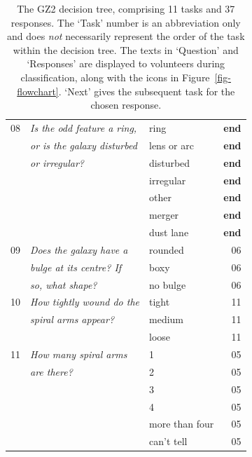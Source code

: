 \documentclass[useAMS,usenatbib]{mn2e}
\begin{document}
\begin{table}
\begin{tabular}{@{}cllr}
08    & {\it Is the odd feature a ring,    }  & ring             & {\bf end}        \\
      & {\it or is the galaxy disturbed    }  & lens or arc      & {\bf end}        \\
      & {\it or irregular?                 }  & disturbed        & {\bf end}        \\
      & {\it                               }  & irregular        & {\bf end}        \\  
      & {\it                               }  & other            & {\bf end}        \\  
      & {\it                               }  & merger           & {\bf end}        \\  
      & {\it                               }  & dust lane        & {\bf end}        \\  
      \hline
09    & {\it Does the galaxy have a        }  & rounded          & 06 \\
      & {\it bulge at its centre? If       }  & boxy             & 06 \\
      & {\it so, what shape?               }  & no bulge         & 06 \\
      \hline
10    & {\it How tightly wound do the      }  & tight            & 11 \\
      & {\it spiral arms appear?           }  & medium           & 11 \\
      & {\it                               }  & loose            & 11 \\    
      \hline
11    & {\it How many spiral arms          }  & 1                & 05 \\
      & {\it  are there?                   }  & 2                & 05 \\
      & {\it                               }  & 3                & 05 \\
      & {\it                               }  & 4                & 05 \\
      & {\it                               }  & more than four   & 05 \\
      & {\it                               }  & can't tell       & 05 \\
\hline
 \end{tabular}
 \caption{The GZ2 decision tree, comprising 11 tasks and 37 responses. The `Task' number is an abbreviation only and does {\em not} necessarily represent the order of the task within the decision tree. The texts in `Question' and `Responses' are displayed to volunteers during classification, along with the icons in Figure~\ref{fig-flowchart}. `Next' gives the subsequent task for the chosen response. \label{tbl-tree}}
\end{table}
\end{document}
